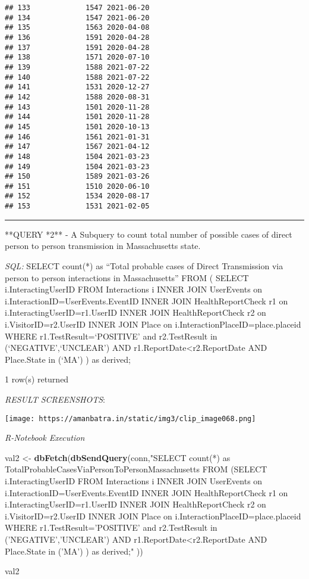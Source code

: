 \documentclass[
]{article}
\newenvironment{Shaded}{\begin{snugshade}}{\end{snugshade}}
\newcommand{\KeywordTok}[1]{\textcolor[rgb]{0.13,0.29,0.53}{\textbf{#1}}}
\newcommand{\NormalTok}[1]{#1}
\newcommand{\StringTok}[1]{\textcolor[rgb]{0.31,0.60,0.02}{#1}}
\begin{document}
\begin{verbatim}
## 133             1547 2021-06-20
## 134             1547 2021-06-20
## 135             1563 2020-04-08
## 136             1591 2020-04-28
## 137             1591 2020-04-28
## 138             1571 2020-07-10
## 139             1588 2021-07-22
## 140             1588 2021-07-22
## 141             1531 2020-12-27
## 142             1588 2020-08-31
## 143             1501 2020-11-28
## 144             1501 2020-11-28
## 145             1501 2020-10-13
## 146             1561 2021-01-31
## 147             1567 2021-04-12
## 148             1504 2021-03-23
## 149             1504 2021-03-23
## 150             1589 2021-03-26
## 151             1510 2020-06-10
## 152             1534 2020-08-17
## 153             1531 2021-02-05
\end{verbatim}

\begin{center}\rule{0.5\linewidth}{0.5pt}\end{center}

**QUERY *2** - A Subquery to count total number of possible cases of
direct person to person transmission in Massachusetts state.

\emph{SQL:} SELECT count(*) as ``Total probable cases of Direct
Transmission via person to person interactions in Massachusetts'' FROM (
SELECT i.InteractingUserID FROM Interactions i INNER JOIN UserEvents on
i.InteractionID=UserEvents.EventID INNER JOIN HealthReportCheck r1 on
i.InteractingUserID=r1.UserID INNER JOIN HealthReportCheck r2 on
i.VisitorID=r2.UserID INNER JOIN Place on
i.InteractionPlaceID=place.placeid WHERE r1.TestResult=`POSITIVE' and
r2.TestResult in (`NEGATIVE',`UNCLEAR') AND
r1.ReportDate\textless r2.ReportDate AND Place.State in (`MA') ) as
derived;

1 row(s) returned

\emph{RESULT SCREENSHOTS}:

\texttt{[image: https://amanbatra.in/static/img3/clip\_image068.png]}

\emph{R-Notebook Execution}

\begin{Shaded}
\begin{Highlighting}[]
\NormalTok{val2 <-}\StringTok{ }\KeywordTok{dbFetch}\NormalTok{(}\KeywordTok{dbSendQuery}\NormalTok{(conn,}\StringTok{"SELECT count(*) as  TotalProbableCasesViaPersonToPersonMassachusetts}
\StringTok{FROM}
\StringTok{ (SELECT i.InteractingUserID FROM Interactions i}
\StringTok{INNER JOIN UserEvents on i.InteractionID=UserEvents.EventID}
\StringTok{INNER JOIN HealthReportCheck r1 on i.InteractingUserID=r1.UserID}
\StringTok{INNER JOIN HealthReportCheck r2 on i.VisitorID=r2.UserID}
\StringTok{INNER JOIN Place on  i.InteractionPlaceID=place.placeid}
\StringTok{WHERE r1.TestResult='POSITIVE' and r2.TestResult in ('NEGATIVE','UNCLEAR')}
\StringTok{AND r1.ReportDate<r2.ReportDate}
\StringTok{AND Place.State in ('MA')}
\StringTok{) as derived;"}\NormalTok{ ))}

\NormalTok{val2}
\end{Highlighting}
\end{Shaded}
\end{document}
